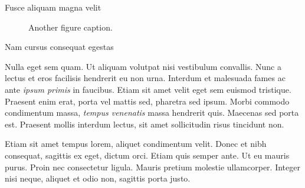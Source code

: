 \documentclass[final]{beamer}
\newlength{\colwidth}
\begin{document}
\begin{frame}[t]
\begin{columns}[t]
\begin{column}{\colwidth}
\begin{block}{Fusce aliquam magna velit}
        \begin{figure}
          \centering
          \caption{Another figure caption.}
        \end{figure}

      \end{block}

      \begin{block}{Nam cursus consequat egestas}

        Nulla eget sem quam. Ut aliquam volutpat nisi vestibulum convallis. Nunc a
        lectus et eros facilisis hendrerit eu non urna. Interdum et malesuada fames
        ac ante \textit{ipsum primis} in faucibus. Etiam sit amet velit eget sem
        euismod tristique. Praesent enim erat, porta vel mattis sed, pharetra sed
        ipsum. Morbi commodo condimentum massa, \textit{tempus venenatis} massa
        hendrerit quis. Maecenas sed porta est. Praesent mollis interdum lectus,
        sit amet sollicitudin risus tincidunt non.

        Etiam sit amet tempus lorem, aliquet condimentum velit. Donec et nibh
        consequat, sagittis ex eget, dictum orci. Etiam quis semper ante. Ut eu
        mauris purus. Proin nec consectetur ligula. Mauris pretium molestie
        ullamcorper. Integer nisi neque, aliquet et odio non, sagittis porta justo.


\end{block}
\end{column}
\end{columns}
\end{frame}
\end{document}
